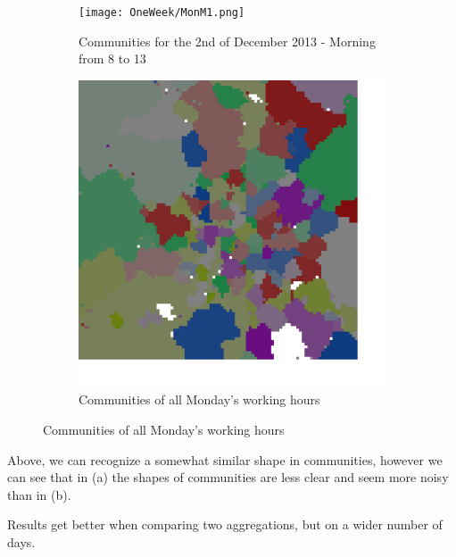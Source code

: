 \documentclass[12pt,a4paper]{article}
\begin{document}
\begin{figure}[H]
\begin{subfigure}[b]{0.48\textwidth}
\texttt{[image: OneWeek/MonM1.png]}
\caption{Communities for the 2nd of December 2013 - Morning from 8 to 13}
\end{subfigure}
\begin{subfigure}[b]{0.48\textwidth}
\includegraphics[width=\textwidth]{week/1Mon.png}
\caption{Communities of all Monday's working hours}
\end{subfigure}
\end{figure}

Above, we can recognize a somewhat similar shape in communities, however we can see that in (a) the shapes of communities are less clear and seem more noisy than in (b).

Results get better when comparing two aggregations, but on a wider number of days.
\end{document}
